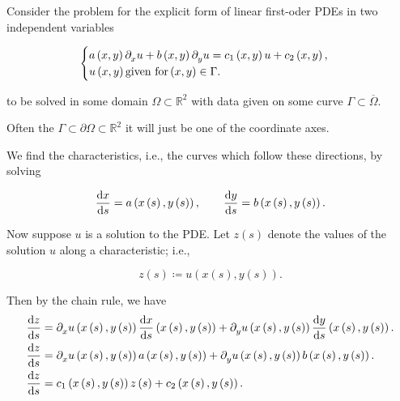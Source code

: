Consider the problem for the explicit form of linear first-oder
PDEs in two independent variables

\begin{equation*}
	\begin{cases}
		a
		\left(x,y\right)
		\difcp{u}{x}+
		b
		\left(x,y\right)
		\difcp{u}{y}=
		c_{1}
		\left(x,y\right)
		u+
		c_{2}
		\left(x,y\right), \\
		u\left(x,y\right)
		\text{given for}
		\left(x,y\right)\in
		\Gamma.
	\end{cases}
\end{equation*}

to be solved in some domain
\begin{math}
	\Omega\subset
	\mathbb{R}^{2}
\end{math}
with data given on some curve
\begin{math}
	\Gamma\subset
	\overline\Omega
\end{math}.

Often the
\begin{math}
	\Gamma\subset
	\partial\Omega\subset
	\mathbb{R}^{2}
\end{math}
it will just be one of the coordinate axes.

We find the characteristics, i.e., the curves which follow these
directions, by solving

\begin{equation*}
	\diff{x}{s}=
	a
	\left(
	x\left(s\right),
	y\left(s\right)
	\right),\qquad
	\diff{y}{s}=
	b
	\left(
	x\left(s\right),
	y\left(s\right)
	\right).
\end{equation*}

Now suppose $u$ is a solution to the PDE.
Let $z\left(s\right)$ denote the values of the solution $u$ along a
characteristic; i.e.,

\begin{equation*}
	z
	\left(s\right)\coloneqq
	u
	\left(
	x\left(s\right),
	y\left(s\right)
	\right).
\end{equation*}

Then by the chain rule, we have
\begin{align*}
	\diff{z}{s}
	 & =
	\difcp{u}{x}
	\left(
	x\left(s\right),
	y\left(s\right)
	\right)
	\diff{x}{s}
	\left(
	x\left(s\right),
	y\left(s\right)
	\right)+
	\difcp{u}{y}
	\left(
	x\left(s\right),
	y\left(s\right)
	\right)
	\diff{y}{s}
	\left(
	x\left(s\right),
	y\left(s\right)
	\right). \\
	\diff{z}{s}
	 & =
	\difcp{u}{x}
	\left(
	x\left(s\right),
	y\left(s\right)
	\right)
	a
	\left(
	x\left(s\right),
	y\left(s\right)
	\right)+
	\difcp{u}{y}
	\left(
	x\left(s\right),
	y\left(s\right)
	\right)
	b
	\left(
	x\left(s\right),
	y\left(s\right)
	\right). \\
	\diff{z}{s}
	 & =
	c_{1}
	\left(
	x\left(s\right),
	y\left(s\right)
	\right)
	z
	\left(s\right)+
	c_{2}
	\left(
	x\left(s\right),
	y\left(s\right)
	\right).
\end{align*}

